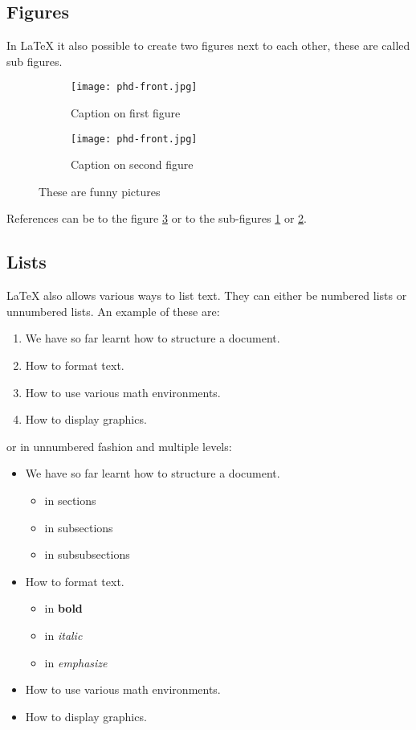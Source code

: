 \documentclass[a4paper,12pt]{article}
\begin{document}
\newpage
\subsection{Figures}
In \LaTeX{} it also possible to create two figures next to each other, these are called sub figures.

\begin{figure}[htb]
    \centering
    \begin{subfigure}[b]{0.475\textwidth}
        \centering
        \texttt{[image: phd-front.jpg]}
        \caption{Caption on first figure}
        \label{fig:subfig1}
    \end{subfigure}
    \hfill
    \begin{subfigure}[b]{0.475\textwidth}
        \centering
        \texttt{[image: phd-front.jpg]}
        \caption{Caption on second figure}
        \label{fig:subfig2}
    \end{subfigure}
    \caption{These are funny pictures}
    \label{fig:funnypic}
\end{figure}

References can be to the figure \ref{fig:funnypic} or to the sub-figures \ref{fig:subfig1} or \ref{fig:subfig2}.

\subsection{Lists}
\LaTeX{} also allows various ways to list text. They can either be numbered lists or unnumbered lists. An example of these are:
\begin{enumerate}
	\item We have so far learnt how to structure a document.
	\item How to format text.
	\item How to use various math environments.
	\item How to display graphics.
\end{enumerate}

or in unnumbered fashion and multiple levels:

\begin{itemize}
	\item We have so far learnt how to structure a document.
		\begin{itemize}
			\item in sections
			\item in subsections
			\item in subsubsections
		\end{itemize}
	\item How to format text.
		\begin{itemize}
			\item in \textbf{bold}
			\item in \textit{italic}
			\item in \emph{emphasize}
		\end{itemize}
	\item How to use various math environments.
	\item How to display graphics.
\end{itemize}
\end{document}
